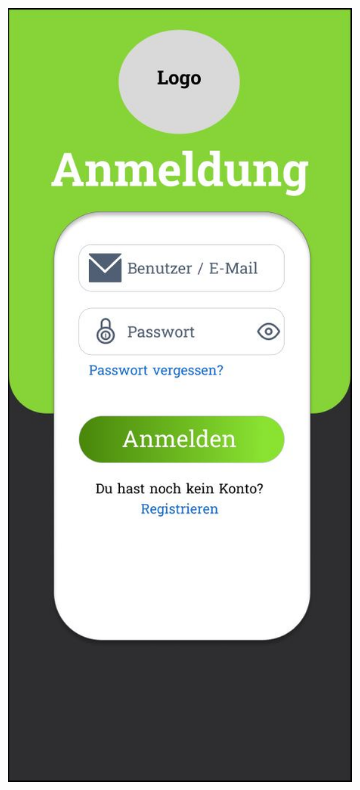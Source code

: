     \begin{figure}[htbp]
        \centering
        \begin{subfigure}[b]{0.45\linewidth}
          \centering
          \includegraphics[width=\linewidth]{images/Mockups/Login.JPG}

\end{subfigure}
\end{figure}
